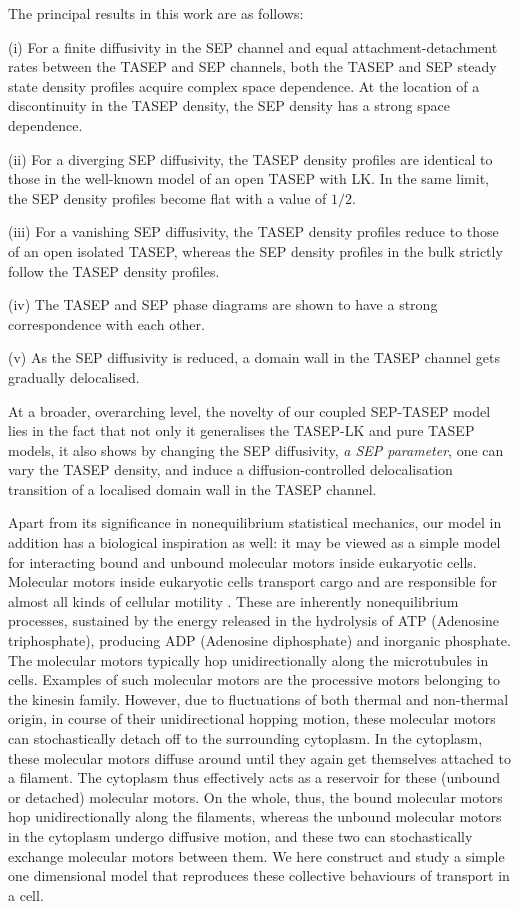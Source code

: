 \documentclass[aps,pre,twocolumn,superscriptaddress,amsmath,amssymb,longbibliography,floatfix,nofootinbib]{revtex4}
\begin{document}
{ The principal results in this work are as follows:

(i) For a finite diffusivity in the SEP channel and equal attachment-detachment rates between the TASEP and SEP channels, both the TASEP and SEP steady state density profiles acquire complex space dependence. At the location of a discontinuity in the TASEP density, the SEP density has a strong space dependence.

(ii) For a diverging SEP diffusivity, the TASEP density profiles are identical to those in the well-known model of an open TASEP with LK. In the same limit, the SEP density profiles become flat with a value of $1/2$.

(iii) For a vanishing SEP diffusivity, the TASEP density profiles reduce to those of an open isolated TASEP, whereas the SEP density profiles in the bulk strictly follow the TASEP density profiles.

(iv) The TASEP and SEP phase diagrams are shown to have a strong correspondence with each other.

(v) As the SEP diffusivity is reduced, a domain wall in the TASEP channel gets gradually delocalised.

 At a broader, overarching level, the novelty of our coupled SEP-TASEP model lies in the fact that not only it generalises the TASEP-LK and pure TASEP models, it also shows by changing the SEP diffusivity, {\em a SEP parameter}, one can vary the TASEP density, and induce a diffusion-controlled delocalisation transition of a localised domain wall in the TASEP channel.} 

Apart from its  significance in nonequilibrium statistical mechanics,
our model in addition has a biological inspiration as well: it may be viewed
as a simple model for interacting bound and unbound molecular motors
inside eukaryotic cells. Molecular motors inside eukaryotic cells transport cargo and are responsible for almost 
all kinds of cellular motility \cite{motor}.
These are inherently nonequilibrium processes, sustained by 
the energy released in the hydrolysis of
ATP (Adenosine triphosphate), producing ADP (Adenosine 
diphosphate) and inorganic phosphate.
The molecular motors typically hop  unidirectionally
along the microtubules in cells. Examples of
 such molecular motors are the processive motors belonging to the kinesin 
family. However, due to fluctuations of both thermal and non-thermal
origin,  in course of their unidirectional 
hopping motion, these molecular motors can stochastically detach off to the surrounding cytoplasm.
In the cytoplasm, these molecular motors  
diffuse around until they again get themselves attached to a filament.
The cytoplasm thus effectively acts as a reservoir for these (unbound or detached) 
molecular motors. On the whole, thus, the bound molecular 
motors hop unidirectionally along the filaments, whereas the unbound 
molecular motors in the cytoplasm undergo diffusive motion, and these two
can stochastically exchange molecular motors between them. We here construct and study a simple one dimensional model that reproduces these collective 
behaviours of transport in a cell.
\end{document}
